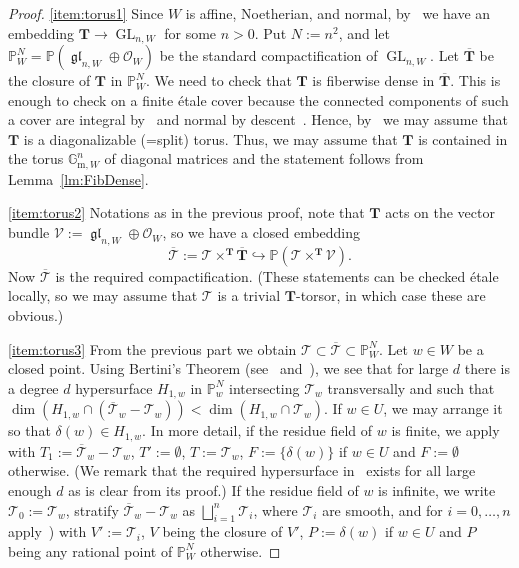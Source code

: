 \documentclass[11pt]{amsart}
\renewcommand\P{\mathbb P}
\newcommand\gm[1]{\mathbb{G}_{\mathrm{m},#1}}
\newcommand\gmW{\gm{W}}
\DeclareMathOperator{\GL}{GL}
\DeclareMathOperator{\gl}{\mathfrak{gl}}
\theoremstyle{plain}
\theoremstyle{definition}
\theoremstyle{remark}
\newcommand\cO{{\mathcal{O}}}
\newcommand\cT{{\mathcal{T}}}
\newcommand\cV{{\mathcal{V}}}
\newcommand\bT{{\mathbf T}}
\begin{document}
\begin{proof}
\eqref{item:torus1} Since $W$ is affine, Noetherian, and normal, by~\cite[Cor.~3.2(3)]{ThomasonResolution} we have an embedding $\bT\to\GL_{n,W}$ for some $n>0$. Put $N:=n^2$, and let $\P_W^N=\P(\gl_{n,W}\oplus\cO_W)$ be the standard compactification of $\GL_{n,W}$. Let $\overline\bT$ be the closure of $\bT$ in $\P_W^N$. We need to check that $\bT$ is fiberwise dense in $\overline\bT$. This is enough to check on a finite \'etale cover because the connected components of such a cover are integral by~\cite[Tag0BQL]{StacksProject} and normal by descent~\cite[Tag034F]{StacksProject}. Hence, by~\cite[Exp.~X, thm.~5.16]{SGA3-2} we may assume that $\bT$ is a diagonalizable (=split) torus. Thus, we may assume that $\bT$ is contained in the torus $\gmW^n$ of diagonal matrices and the statement follows from Lemma~\ref{lm:FibDense}.

\eqref{item:torus2} Notations as in the previous proof, note that $\bT$ acts on the vector bundle $\cV:=\gl_{n,W}\oplus\cO_W$, so we have a closed embedding
\[
    \overline\cT:=\cT\times^\bT\overline\bT\hookrightarrow\P(\cT\times^\bT\cV).
\]
Now $\overline\cT$ is the required compactification. (These statements can be checked \'etale locally, so we may assume that $\cT$ is a trivial $\bT$-torsor, in which case these are obvious.)

\eqref{item:torus3} From the previous part we obtain $\cT\subset\overline\cT\subset\P_W^N$. Let $w\in W$ be a closed point. Using Bertini's Theorem (see~\cite{PoonenOnBertini} and~\cite[exp.~XI, thm.~2.1(ii)]{SGA4-3}), we see that for large $d$ there is a degree $d$ hypersurface $H_{1,w}$ in $\P_w^N$
intersecting $\cT_w$ transversally and such that $\dim(H_{1,w}\cap(\overline\cT_w-\cT_w))<\dim(H_{1,w}\cap\cT_w)$. If $w\in U$, we may arrange it so that $\delta(w)\in H_{1,w}$. In more detail, if the residue field of $w$ is finite, we apply~\cite[Prop.~3.12]{FedorovMixedChar} with $T_1:=\overline\cT_w-\cT_w$, $T':=\emptyset$, $T:=\cT_w$, $F:=\{\delta(w)\}$ if $w\in U$ and $F:=\emptyset$ otherwise. (We remark that the required hypersurface in~\cite[Prop.~3.12]{FedorovMixedChar} exists for all large enough $d$ as is clear from its proof.) If the residue field of $w$ is infinite, we write $\cT_0:=\cT_w$, stratify $\overline\cT_w-\cT_w$ as $\bigsqcup_{i=1}^n\cT_i$, where $\cT_i$ are smooth, and for $i=0,\ldots,n$ apply~\cite[exp.~XI, thm.~2.1(ii)]{SGA4-3}) with $V':=\cT_i$, $V$ being the closure of $V'$, $P:=\delta(w)$ if $w\in U$ and $P$ being any rational point of $\P_W^N$ otherwise.


\end{proof}
\end{document}

